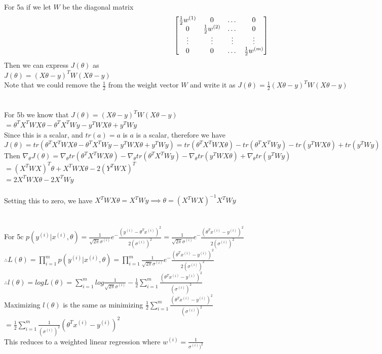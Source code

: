\begin{answer}\\
For 5a if we let $W$ be the diagonal matrix\\
\[
\begin{bmatrix}
\frac{1}{2}w^{(1)} & 0 & \dots & 0 \\
0 & \frac{1}{2}w^{(2)} & \dots & 0 \\
\vdots & \vdots & \vdots  & \vdots \\
0 & 0 & \dots & \frac{1}{2}w^{(m)} \\
\end{bmatrix}\\
\]
Then we can express $J(\theta)$ as \\
$J(\theta)=(X \theta - y)^TW(X \theta -y)$\\
Note that we could remove the $\frac{1}{2}$ from the weight vector $W$ and write it as $J(\theta)=\frac{1}{2}(X \theta - y)^TW(X \theta -y)$ \\\\\\
For 5b we know that $J(\theta)=(X\theta-y)^TW(X\theta-y)$\\
$=\theta^TX^TWX\theta -\theta^TX^TWy-y^TWX\theta+y^TWy$\\
Since this is a scalar, and $tr(a)=a$ is $a$ is a scalar, therefore we have\\
$J(\theta)=tr(\theta^TX^TWX\theta -\theta^TX^TWy-y^TWX\theta+y^TWy)=tr(\theta^TX^TWX\theta) -tr(\theta^TX^TWy)-tr(y^TWX\theta)+tr(y^TWy)$\\
Then $\nabla_{\theta}J(\theta)=\nabla_{\theta}tr(\theta^TX^TWX\theta) -\nabla_{\theta}tr(\theta^TX^TWy)-\nabla_{\theta}tr(y^TWX\theta)+\nabla_{\theta}tr(y^TWy)$\\
$=(X^TWX)^T\theta+X^TWX\theta-2(Y^TWX)^T$\\
$=2X^TWX\theta-2X^TWy$\\\\
Setting this to zero, we have
$X^TWX\theta=X^TWy \implies \theta=(X^TWX)^{-1}X^TWy$\\
\\
\\
For 5c $p(y^{(i)}|x^{(i)},\theta)=\frac{1}{\sqrt{2 \pi} \sigma^{(i)}} e^-\frac{(y^{(i)}-\theta^Tx^{(i)})^2}{2(\sigma^{(i)})^2}=\frac{1}{\sqrt{2 \pi} \sigma^{(i)}} e^-\frac{(\theta^Tx^{(i)}-y^{(i)})^2}{2(\sigma^{(i)})^2}$\\
$\therefore L(\theta)=\prod_{i=1}^{m}p(y^{(i)}|x^{(i)},\theta)=\prod_{i=1}^{m}\frac{1}{\sqrt{2 \pi} \sigma^{(i)}} e^-\frac{(\theta^Tx^{(i)}-y^{(i)})^2}{2(\sigma^{(i)})^2}$\\
$\therefore l(\theta)=log L(\theta)=\sum_{i=1}^{m}log\frac{1}{\sqrt{2 \pi}\sigma^{(i)}} -\frac{1}{2}\sum_{i=1}^{m}\frac{(\theta^T x^{(i)}-y^{(i)})^2}{(\sigma^{(i)})^2}$\\
Maximizing $l(\theta)$ is the same as minimizing $\frac{1}{2}\sum_{i=1}^{m}\frac{(\theta^T x^{(i)}-y^{(i)})^2}{(\sigma^{(i)})^2}$\\
$=\frac{1}{2}\sum_{i=1}^{m}\frac{1}{(\sigma^{(i)})^2} (\theta^T x^{(i)}-y^{(i)})^2$\\
This reduces to a weighted linear regression where $w^{(i)}=\frac{1}{\sigma^{(i)})^2}$
\end{answer}
